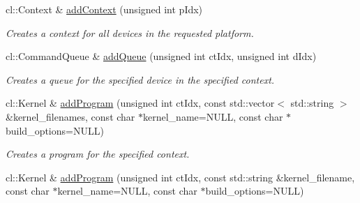 \begin{DoxyCompactItemize}
cl\+::\+Context \& \hyperlink{classclutils_1_1CLEnv_ad22757b987c46b6134c6c16710dabb4a}{add\+Context} (unsigned int p\+Idx)
\begin{DoxyCompactList}\small\item\em Creates a context for all devices in the requested platform. \end{DoxyCompactList}\item 
cl\+::\+Command\+Queue \& \hyperlink{classclutils_1_1CLEnv_ac965d696bc25fb3bc95d601e0e157872}{add\+Queue} (unsigned int ct\+Idx, unsigned int d\+Idx)
\begin{DoxyCompactList}\small\item\em Creates a queue for the specified device in the specified context. \end{DoxyCompactList}\item 
cl\+::\+Kernel \& \hyperlink{classclutils_1_1CLEnv_a05987337a3df8feb7ccfa749f5347fac}{add\+Program} (unsigned int ct\+Idx, const std\+::vector$<$ std\+::string $>$ \&kernel\+\_\+filenames, const char $\ast$kernel\+\_\+name=N\+U\+L\+L, const char $\ast$build\+\_\+options=N\+U\+L\+L)
\begin{DoxyCompactList}\small\item\em Creates a program for the specified context. \end{DoxyCompactList}\item 
cl\+::\+Kernel \& \hyperlink{classclutils_1_1CLEnv_a08691649ccbacc817997ebe989d38171}{add\+Program} (unsigned int ct\+Idx, const std\+::string \&kernel\+\_\+filename, const char $\ast$kernel\+\_\+name=N\+U\+L\+L, const char $\ast$build\+\_\+options=N\+U\+L\+L)
\end{DoxyCompactItemize}
